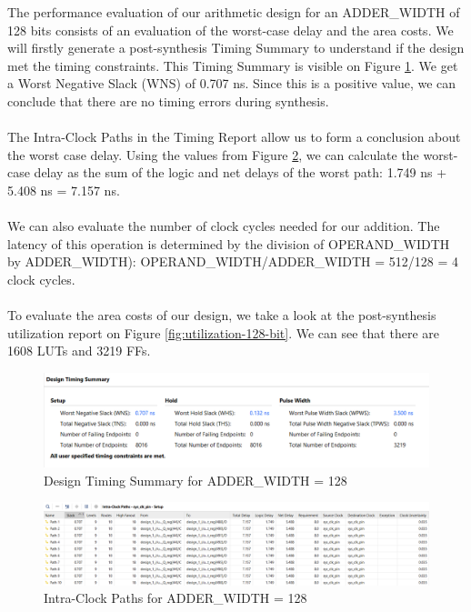 \documentclass[a4paper,kul]{kulakarticle} %
\begin{document}
The performance evaluation of our arithmetic design for an ADDER\_WIDTH of 128 bits consists of an evaluation of the worst-case delay and the area costs. We will firstly generate a post-synthesis Timing Summary to understand if the design met the timing constraints. This Timing Summary is visible on Figure \ref{fig:timing-128-bit}. We get a Worst Negative Slack (WNS) of 0.707 ns. Since this is a positive value, we can conclude that there are no timing errors during synthesis.
\\\\
The Intra-Clock Paths in the Timing Report allow us to form a conclusion about the worst case delay. Using the values from Figure \ref{fig:paths-128-bit}, we can calculate the worst-case delay as the sum of the logic and net delays of the worst path: 1.749 ns + 5.408 ns = 7.157 ns.
\\\\
We can also evaluate the number of clock cycles needed for our addition. The latency of this operation is determined by the division of OPERAND\_WIDTH by ADDER\_WIDTH): OPERAND\_WIDTH/ADDER\_WIDTH = 512/128 = 4 clock cycles.
\\\\
To evaluate the area costs of our design, we take a look at the post-synthesis utilization report on Figure \ref{fig:utilization-128-bit}. We can see that there are 1608 LUTs and 3219 FFs.  

\begin{figure}[h]
	\centering
	\includegraphics[width=0.75\linewidth]{images/timing-128-bit.png}
	\caption{Design Timing Summary for ADDER\_WIDTH = 128}
	\label{fig:timing-128-bit}
\end{figure}

\begin{figure}[h]
	\centering
	\includegraphics[width=0.75\linewidth]{images/paths-128-bit.png}
	\caption{Intra-Clock Paths for ADDER\_WIDTH = 128}
	\label{fig:paths-128-bit}
\end{figure}
\end{document}
